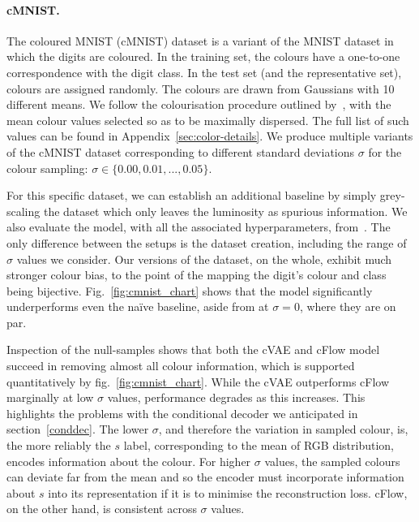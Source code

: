 \paragraph{cMNIST.}
The coloured MNIST (cMNIST) dataset is a variant of the MNIST dataset in which the digits are coloured.
In the training set, the colours have a one-to-one correspondence with the digit class.
In the test set (and the representative set), colours are assigned randomly.
The colours are drawn from Gaussians with 10 different means.
We follow the colourisation procedure outlined by~\citet{kim2019learning}, with the mean colour values selected so as to be maximally dispersed.
The full list of such values can be found in Appendix~\ref{sec:color-details}.
We produce multiple variants of the cMNIST dataset corresponding to different standard deviations $\sigma$ for the colour sampling:
$\sigma \in \{0.00, 0.01, ..., 0.05 \}$.

For this specific dataset, we can establish an additional baseline by simply grey-scaling the dataset
which only leaves the luminosity as spurious information.
We also evaluate the model, with all the associated hyperparameters, from~\citet{kim2019learning}.
The only difference between the setups is the dataset creation, including the range of $\sigma$ values we consider.
Our versions of the dataset, on the whole, exhibit much stronger colour bias, to the point of the mapping the digit's colour and class being bijective.
Fig.~\ref{fig:cmnist_chart} shows that the model significantly underperforms even the na\"ive baseline, aside from at $\sigma = 0$, where they are on par.

Inspection of the null-samples shows that both the cVAE and cFlow model succeed in removing almost all colour information, which is supported quantitatively by fig.~\ref{fig:cmnist_chart}.
While the cVAE outperforms cFlow marginally at low $\sigma$ values, performance degrades
as this increases.
This highlights the problems with the conditional decoder we anticipated in section~\ref{conddec}.
The lower $\sigma$, and therefore the variation in sampled colour, is, the more reliably the $s$ label, corresponding to the mean of RGB distribution, encodes information about the colour.
For higher $\sigma$ values, the sampled colours can deviate far from the mean and so the encoder must incorporate information about $s$ into its representation if it is to minimise the reconstruction loss.
cFlow, on the other hand, is consistent across $\sigma$ values.

